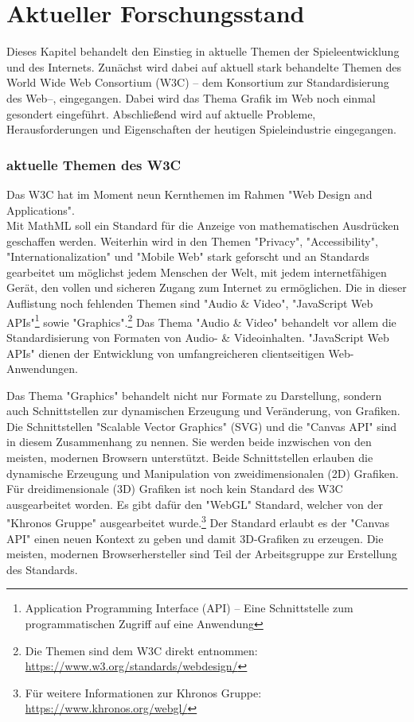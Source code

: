 \section{Aktueller Forschungsstand}
\label{sec:aktueller_forschungsstand}
\noindent Dieses Kapitel behandelt den Einstieg in aktuelle Themen der Spieleentwicklung und des Internets. Zunächst wird dabei auf aktuell stark behandelte Themen des World Wide Web Consortium (W3C) -- dem Konsortium zur Standardisierung des Web--, eingegangen. Dabei wird das Thema Grafik im Web noch einmal gesondert eingeführt. Abschließend wird auf aktuelle Probleme, Herausforderungen und Eigenschaften der heutigen Spieleindustrie eingegangen.

\subsubsection{aktuelle Themen des W3C}
Das W3C hat im Moment neun Kernthemen im Rahmen "Web Design and Applications".\\
Mit MathML soll ein Standard für die Anzeige von mathematischen Ausdrücken geschaffen werden. Weiterhin wird in den Themen "Privacy", "Accessibility", "Internationalization" und "Mobile Web" stark geforscht und an Standards gearbeitet um möglichst jedem Menschen der Welt, mit jedem internetfähigen Gerät, den vollen und sicheren Zugang zum Internet zu ermöglichen. Die in dieser Auflistung noch fehlenden Themen sind "Audio \& Video", "JavaScript Web APIs"\footnote{Application Programming Interface (API) -- Eine Schnittstelle zum programmatischen Zugriff auf eine Anwendung} sowie "Graphics".\footnote{Die Themen sind dem W3C direkt entnommen: \url{https://www.w3.org/standards/webdesign/}}
Das Thema "Audio \& Video" behandelt vor allem die Standardisierung von Formaten von Audio- \& Videoinhalten. "JavaScript Web APIs" dienen der Entwicklung von umfangreicheren clientseitigen Web-Anwendungen.

\noindent Das Thema "Graphics" behandelt nicht nur Formate zu Darstellung, sondern auch Schnittstellen zur dynamischen Erzeugung und Veränderung, von Grafiken. Die Schnittstellen "Scalable Vector Graphics" (SVG) und die "Canvas API" sind in diesem Zusammenhang zu nennen. Sie werden beide inzwischen von den meisten, modernen Browsern unterstützt. Beide Schnittstellen erlauben die dynamische Erzeugung und Manipulation von zweidimensionalen (2D) Grafiken. Für dreidimensionale (3D) Grafiken ist noch kein Standard des W3C ausgearbeitet worden. Es gibt dafür den "WebGL" Standard, welcher von der "Khronos Gruppe" ausgearbeitet wurde.\footnote{Für weitere Informationen zur Khronos Gruppe: \url{https://www.khronos.org/webgl/}} Der Standard erlaubt es der "Canvas API" einen neuen Kontext zu geben und damit 3D-Grafiken zu erzeugen. Die meisten, modernen Browserhersteller sind Teil der Arbeitsgruppe zur Erstellung des Standards.


